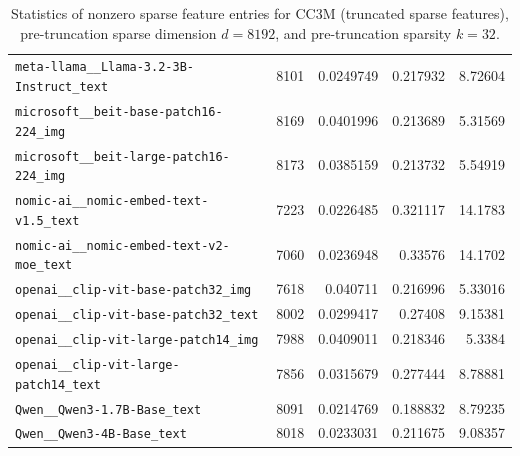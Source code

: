 \begin{table}[htbp]
{\begin{tabular}{lrrrr}
\texttt{meta-llama\_\_Llama-3.2-3B-Instruct\_text} & 8101 & 0.0249749 & 0.217932 & 8.72604 \\
\texttt{microsoft\_\_beit-base-patch16-224\_img} & 8169 & 0.0401996 & 0.213689 & 5.31569 \\
\texttt{microsoft\_\_beit-large-patch16-224\_img} & 8173 & 0.0385159 & 0.213732 & 5.54919 \\
\texttt{nomic-ai\_\_nomic-embed-text-v1.5\_text} & 7223 & 0.0226485 & 0.321117 & 14.1783 \\
\texttt{nomic-ai\_\_nomic-embed-text-v2-moe\_text} & 7060 & 0.0236948 & 0.33576 & 14.1702 \\
\texttt{openai\_\_clip-vit-base-patch32\_img} & 7618 & 0.040711 & 0.216996 & 5.33016 \\
\texttt{openai\_\_clip-vit-base-patch32\_text} & 8002 & 0.0299417 & 0.27408 & 9.15381 \\
\texttt{openai\_\_clip-vit-large-patch14\_img} & 7988 & 0.0409011 & 0.218346 & 5.3384 \\
\texttt{openai\_\_clip-vit-large-patch14\_text} & 7856 & 0.0315679 & 0.277444 & 8.78881 \\
\texttt{Qwen\_\_Qwen3-1.7B-Base\_text} & 8091 & 0.0214769 & 0.188832 & 8.79235 \\
\texttt{Qwen\_\_Qwen3-4B-Base\_text} & 8018 & 0.0233031 & 0.211675 & 9.08357 \\
\bottomrule
\end{tabular}
}%
\caption{Statistics of nonzero sparse feature entries for CC3M (truncated sparse features), pre-truncation sparse dimension $d=8192$, and pre-truncation sparsity $k=32$.}
\label{tab:sparse-feature-entries-cc3m-truncated-d8192-k32}
\end{table}
